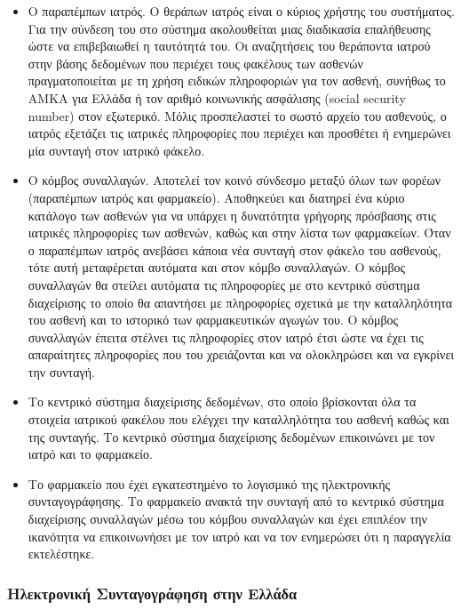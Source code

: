 		\begin{itemize}

		\item Ο παραπέμπων ιατρός. Ο θεράπων ιατρός είναι ο κύριος χρήστης  του συστήματος. Για την σύνδεση του στο σύστημα ακολουθείται μιας διαδικασία επαλήθευσης ώστε να επιβεβαιωθεί η ταυτότητά του. 
Οι αναζητήσεις του θεράποντα ιατρού στην βάσης δεδομένων που περιέχει τους φακέλους των ασθενών πραγματοποιείται με τη χρήση ειδικών πληροφοριών για τον ασθενή, συνήθως το ΑΜΚΑ για Ελλάδα ή τον αριθμό κοινωνικής ασφάλισης (social security number) στον εξωτερικό. Μόλις προσπελαστεί το σωστό αρχείο του ασθενούς, ο ιατρός εξετάζει τις ιατρικές πληροφορίες που περιέχει και προσθέτει ή ενημερώνει μία συνταγή στον ιατρικό φάκελο.
		
		\item Ο κόμβος συναλλαγών. Αποτελεί τον κοινό σύνδεσμο μεταξύ όλων των φορέων (παραπέμπων ιατρός και φαρμακείο). Αποθηκεύει και διατηρεί ένα κύριο κατάλογο των ασθενών για να υπάρχει η δυνατότητα γρήγορης πρόσβασης στις ιατρικές πληροφορίες των ασθενών, καθώς και στην λίστα των φαρμακείων. Όταν ο παραπέμπων ιατρός ανεβάσει κάποια νέα συνταγή στον φάκελο του ασθενούς, τότε αυτή μεταφέρεται αυτόματα και στον κόμβο συναλλαγών. Ο κόμβος συναλλαγών θα στείλει αυτόματα τις πληροφορίες  με στο κεντρικό σύστημα διαχείρισης το οποίο θα απαντήσει με πληροφορίες σχετικά με την καταλληλότητα του ασθενή και το ιστορικό των φαρμακευτικών αγωγών του.  Ο κόμβος συναλλαγών έπειτα στέλνει τις πληροφορίες στον ιατρό έτσι ώστε να έχει τις απαραίτητες πληροφορίες που του χρειάζονται και να ολοκληρώσει και να εγκρίνει την συνταγή. 
		
		\item Το κεντρικό σύστημα διαχείρισης δεδομένων, στο οποίο βρίσκονται όλα τα στοιχεία ιατρικού φακέλου που ελέγχει την καταλληλότητα του ασθενή καθώς και της συνταγής. Το κεντρικό σύστημα διαχείρισης δεδομένων επικοινώνει με τον ιατρό και το φαρμακείο.
		
		\item Το φαρμακείο που έχει εγκατεστημένο το λογισμικό της ηλεκτρονικής συνταγογράφησης. Το φαρμακείο ανακτά την συνταγή από  το κεντρικό σύστημα διαχείρισης συναλλαγών μέσω του κόμβου συναλλαγών και έχει επιπλέον την ικανότητα να επικοινωνήσει με τον ιατρό και να τον ενημερώσει ότι η παραγγελία εκτελέστηκε. 
		
		\end{itemize}
		
		
		
		\subsubsection{Ηλεκτρονική Συνταγογράφηση στην Ελλάδα}
		
